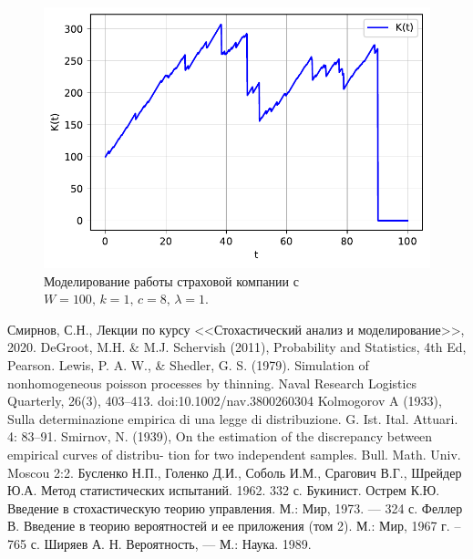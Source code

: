 \documentclass[16pt]{article}
\begin{document}
\begin{figure}
	\center
	\includegraphics[scale=0.7]{11_8.pdf}
	\caption{Моделирование работы страховой компании с $W = 100,\, k = 1,\, c = 8,\, \lambda = 1$.}
\end{figure}
\newpage
\center
\begin{thebibliography}{0}
Смирнов, С.Н., Лекции по курсу <<Стохастический анализ и моделирование>>, 2020.
DeGroot, M.H. \& M.J. Schervish (2011), Probability and Statistics, 4th Ed, Pearson.
Lewis, P. A. W., \& Shedler, G. S. (1979). Simulation of nonhomogeneous poisson processes by thinning. Naval Research Logistics Quarterly, 26(3), 403–413. doi:10.1002/nav.3800260304 
Kolmogorov A (1933), Sulla determinazione empirica di una legge di distribuzione. G. Ist. Ital. Attuari. 4: 83–91.
Smirnov, N. (1939), On the estimation of the discrepancy between empirical curves of distribu- tion for two independent samples. Bull. Math. Univ. Moscou 2:2.
Бусленко Н.П., Голенко Д.И., Соболь И.М., Срагович В.Г., Шрейдер Ю.А. Метод статистических испытаний. 1962. 332 с. Букинист. 
Острем К.Ю. Введение в стохастическую теорию управления. М.: Мир, 1973. --- 324 с.
Феллер В. Введение в теорию вероятностей и ее приложения (том 2). М.: Мир, 1967 г. – 765 с.
Ширяев А. Н. Вероятность, — М.: Наука. 1989. 
\end{thebibliography}
\end{document}
